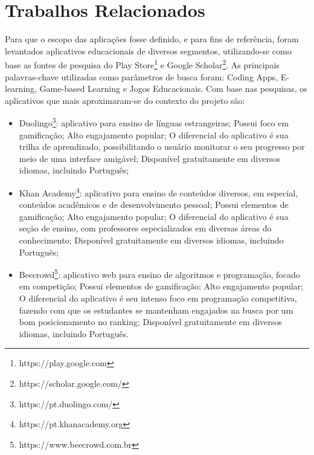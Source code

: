 \section{Trabalhos Relacionados}
Para que o escopo das aplicações fosse definido, e para fins de referência, foram levantados aplicativos educacionais de diversos segmentos, utilizando-se como base as fontes de pesquisa do Play Store\footnote{https://play.google.com} e Google Scholar\footnote{https://scholar.google.com/}. As principais palavras-chave utilizadas como parâmetros de busca foram: Coding Apps, E-learning, Game-based Learning e Jogos Educacionais. Com base nas pesquisas, os aplicativos que mais aproximaram-se do contexto do projeto são:

 \begin{itemize}
   \item Duolingo\footnote{https://pt.duolingo.com/}: aplicativo para ensino de línguas estrangeiras; Possui foco em gamificação; Alto engajamento popular; O diferencial do aplicativo é sua trilha de aprendizado, possibilitando o usuário monitorar o seu progresso por meio de uma interface amigável; Disponível gratuitamente em diversos idiomas, incluindo Português;
   \item Khan Academy\footnote{https://pt.khanacademy.org}: aplicativo para ensino de conteúdos diversos, em especial, conteúdos acadêmicos e de desenvolvimento pessoal; Possui elementos de gamificação; Alto engajamento popular; O diferencial do aplicativo é sua seção de ensino, com professores especializados em diversas áreas do conhecimento; Disponível gratuitamente em diversos idiomas, incluindo Português;
   \item Beecrowd\footnote{https://www.beecrowd.com.br}: aplicativo web para ensino de algoritmos e programação, focado em competição; Possui elementos de gamificação; Alto engajamento popular; O diferencial do aplicativo é seu intenso foco em programação competitiva, fazendo com que os estudantes se mantenham engajados na busca por um bom posicionamento no ranking; Disponível gratuitamente em diversos idiomas, incluindo Português.
 \end{itemize}


